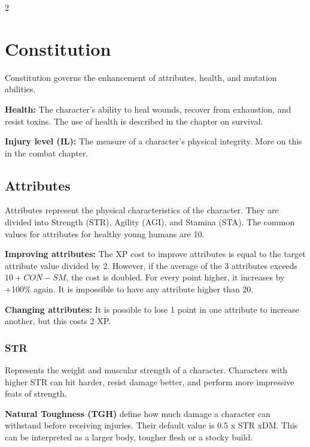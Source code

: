 \begin{multicols}{2}

\section{Constitution}

Constitution governs the enhancement of attributes, health, and \magic mutation abilities.

\textbf{Health:} The character's ability to heal wounds, recover from exhaustion, and resist toxins. The use of health is described in the chapter on survival.

\textbf{Injury level (IL):} The measure of a character's physical integrity. More on this in the combat chapter.

\subsection{Attributes}

Attributes represent the physical characteristics of the character. They are divided into Strength (STR), Agility (AGI), and Stamina (STA). The common values for attributes for healthy young humans are 10.


\textbf{Improving attributes:} The XP cost to improve attributes is equal to the target attribute value divided by 2. However, if the average of the 3 attributes exceeds $10+CON-SM$, the cost is doubled. For every point higher, it increases by +100\% again. It is impossible to have any attribute higher than 20.

\textbf{Changing attributes:} It is possible to lose 1 point in one attribute to increase another, but this costs 2 XP.

\subsubsection{STR}

Represents the weight and muscular strength of a character. Characters with higher STR can hit harder, resist damage better, and perform more impressive feats of strength.

\textbf{ Natural Toughness (TGH)} define how much damage a character can withstand before receiving injuries. Their default value is 0.5 x STR xDM.  This can be interpreted as a larger body, tougher flesh or a stocky build.


\end{multicols}
